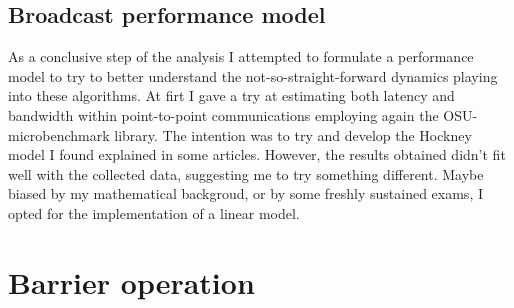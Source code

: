\documentclass{article}
\begin{document}
	\subsection{Broadcast performance model}
	As a conclusive step of the analysis I attempted to formulate a performance model to try to better understand the not-so-straight-forward dynamics playing into these algorithms. 
	At firt I gave a try at estimating both latency and bandwidth within point-to-point communications employing again the OSU-microbenchmark library. The intention was to try and develop the Hockney model I found explained in some articles. However, the results obtained didn't fit well with the collected data, suggesting me to try something different. Maybe biased by my mathematical backgroud, or by some freshly sustained exams, I opted for the implementation of a linear model.
	
	
	
	\section{Barrier operation}
	 
\end{document}
